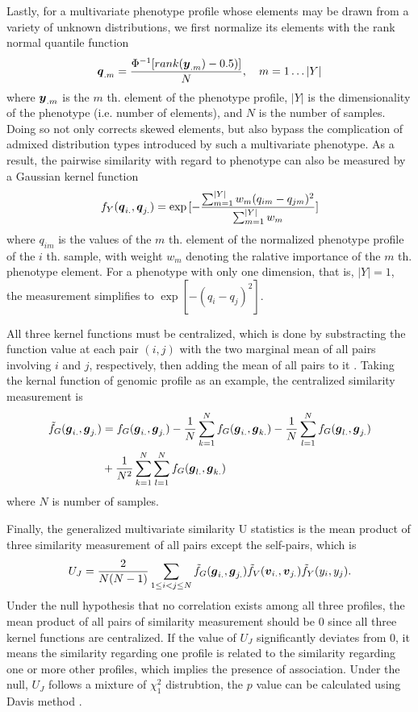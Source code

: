 {Lastly, for a multivariate phenotype profile whose elements may be drawn from a variety of unknown distributions, we first normalize its elements with the rank normal quantile function
\[ \boldsymbol{q}_{.m} = \frac{\Phi^{-1}[rank(\boldsymbol{y}_{.m}) - 0.5)]}{N}, \quad m = 1 \dots |Y| \]
where $\boldsymbol{y}_{.m}$ is the $m$ th. element of the phenotype profile, $|Y|$ is the dimensionality of the phenotype (i.e. number of elements), and $N$ is the number of samples. Doing so not only corrects skewed elements, but also bypass the complication of admixed distribution types introduced by such a multivariate phenotype. As a result, the pairwise similarity with regard to phenotype can also be measured by a Gaussian kernel function
\[ f_Y(\boldsymbol{q}_{i.}, \boldsymbol{q}_{j.}) = \exp{[-\frac{\sum_{m=1}^{|Y|}{w_m(q_{im}-q_{jm})^2}} {\sum_{m=1}^{|Y|}{w_m}}]} \]
where $q_{im}$ is the values of the $m$ th. element of the normalized phenotype profile of the $i$ th. sample, with weight $w_m$ denoting the ralative importance of the $m$ th. phenotype element. For a phenotype with only one dimension, that is, $|Y|=1$, the measurement simplifies to $\exp{[-(q_i - q_j)^2]}$.

All three kernel functions must be centralized, which is done by substracting the function value at each pair $(i,j)$ with the two marginal mean of all pairs involving $i$ and $j$, respectively, then adding the mean of all pairs to it \cite{UST1}. Taking the kernal function of genomic profile as an example, the centralized similarity measurement is
\begin{align*}
  \tilde{f}_G(\boldsymbol{g}_{i.}, \boldsymbol{g}_{j.})
  &= f_G(\boldsymbol{g}_{i.}, \boldsymbol{g}_{j.})-\frac{1}{N} \sum_{k=1}^N{f_G(\boldsymbol{g}_{i.}, \boldsymbol{g}_{k.})}-\frac{1}{N}\sum_{l=1}^N{f_G(\boldsymbol{g}_{l.}, \boldsymbol{g}_{j.})} \\ 
  &+ \frac{1}{N^2} \sum_{k=1}^{N} \sum_{l=1}^{N} {f_G(\boldsymbol{g}_{l.}, \boldsymbol{g}_{k.})}
\end{align*}
where $N$ is number of samples. 

Finally, the generalized multivariate similarity U statistics is the mean product of three similarity measurement of all pairs except the self-pairs, which is
\[ U_J = \frac{2}{N(N-1)} \sum_{1 \leq i < j \leq N}^{} \tilde{f}_G(\boldsymbol{g}_{i.}, \boldsymbol{g}_{j.}) \tilde{f}_V(\boldsymbol{v}_{i.}, \boldsymbol{v}_{j.}) \tilde{f}_Y(y_i, y_j). \]
Under the null hypothesis that no correlation exists among all three profiles, the mean product of all pairs of similarity measurement should be $0$ since all three kernel functions are centralized. If the value of $U_J$ significantly deviates from $0$, it means the similarity regarding one profile is related to the similarity regarding one or more other profiles, which implies the presence of association. Under the null, $U_J$ follows a mixture of $\chi_1^2$ distrubtion, the $p$ value can be calculated using Davis method \cite{UST1, UST2}.

}
